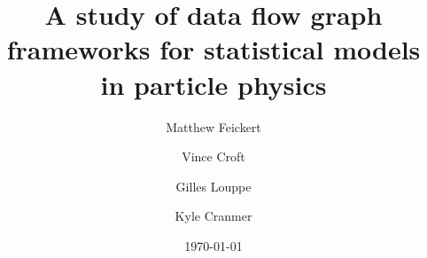 \documentclass[12pt,letterpaper]{article}
\title{A study of data flow graph frameworks for statistical models in particle physics}
\author[1]{\small{Matthew Feickert}}
\author[2]{Vince Croft}
\author[2]{Gilles Louppe}
\author[2]{Kyle Cranmer}
\affil[1]{\small{Southern Methodist University}}
\affil[2]{New York University}
\date{\today}
\begin{document}
\maketitle
\begin{abstract}
 
\end{abstract}
\clearpage

\tableofcontents

\clearpage





\clearpage


\clearpage
\flushbottom
%


\end{document}
